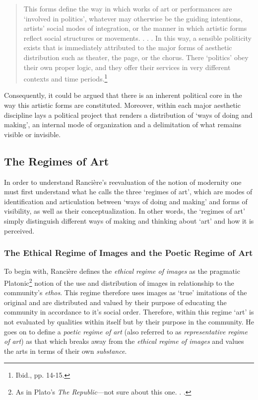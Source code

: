 \begin{quote}
This forms define the way in which works of art or performances are `involved in politics', whatever may otherwise be the guiding intentions, artists' social modes of integration, or the manner in which artistic forms reflect social structures or movements. . . . In this way, a sensible politicity exists that is immediately attributed to the major forms of aesthetic distribution such as theater, the page, or the chorus. There `politics' obey their own proper logic, and they offer their services in very different contexts and time periods.\footnote{Ibid., pp. 14-15.} 
\end{quote}
Consequently, it could be argued that there is an inherent political core in the way this artistic forms are constituted. Moreover, within each major aesthetic discipline lays a political project that renders a distribution of `ways of doing and making', an internal mode of organization and a delimitation of what remains visible or invisible.    

\subsection{The Regimes of Art}

In order to understand Ranci\`{e}re's reevaluation of the notion of modernity one must first understand what he calls the three `regimes of art', which are modes of identification and articulation between `ways of doing and making' and forms of visibility, as well as their conceptualization. In other words, the `regimes of art' simply distinguish different ways of making and thinking about `art' and how it is perceived.

\subsubsection{The Ethical Regime of Images and the Poetic Regime of Art}

To begin with, Ranci\`{e}re defines the \emph{ethical regime of images} as the pragmatic Platonic\footnote{As in Plato's \emph{The Republic}---not sure about this one. . .} notion of the use and distribution of images in relationship to the community's \emph{ethos}. This regime therefore uses images as `true' imitations of the original and are distributed and valued by their purpose of educating the community in accordance to it's social order. Therefore, within this regime `art' is not evaluated by qualities within itself but by their purpose in the community. He goes on to define a \emph{poetic regime of art} (also referred to as \emph{representative regime of art}) as that which breaks away from the \emph{ethical regime of images} and values the arts in terms of their own \emph{substance}.

